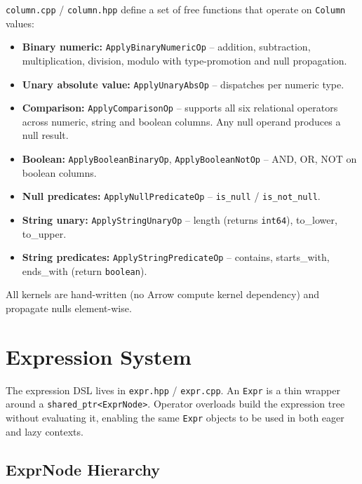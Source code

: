 \documentclass[12pt,a4paper]{article}
\begin{document}
\texttt{column.cpp} / \texttt{column.hpp} define a set of free functions
that operate on \texttt{Column} values:

\begin{itemize}[leftmargin=1.5em]
  \item \textbf{Binary numeric:} \texttt{ApplyBinaryNumericOp} --
        addition, subtraction, multiplication, division, modulo with
        type-promotion and null propagation.
  \item \textbf{Unary absolute value:} \texttt{ApplyUnaryAbsOp} --
        dispatches per numeric type.
  \item \textbf{Comparison:} \texttt{ApplyComparisonOp} -- supports all
        six relational operators across numeric, string and boolean columns.
        Any null operand produces a null result.
  \item \textbf{Boolean:} \texttt{ApplyBooleanBinaryOp},
        \texttt{ApplyBooleanNotOp} -- AND, OR, NOT on boolean columns.
  \item \textbf{Null predicates:} \texttt{ApplyNullPredicateOp} --
        \texttt{is\_null} / \texttt{is\_not\_null}.
  \item \textbf{String unary:} \texttt{ApplyStringUnaryOp} -- length
        (returns \texttt{int64}), to\_lower, to\_upper.
  \item \textbf{String predicates:} \texttt{ApplyStringPredicateOp} --
        contains, starts\_with, ends\_with (return \texttt{boolean}).
\end{itemize}

All kernels are hand-written (no Arrow compute kernel dependency) and
propagate nulls element-wise.

\section{Expression System}

The expression DSL lives in \texttt{expr.hpp} / \texttt{expr.cpp}.  An
\texttt{Expr} is a thin wrapper around a \texttt{shared\_ptr<ExprNode>}.
Operator overloads build the expression tree without evaluating it,
enabling the same \texttt{Expr} objects to be used in both eager and lazy
contexts.

\subsection{ExprNode Hierarchy}
\end{document}
